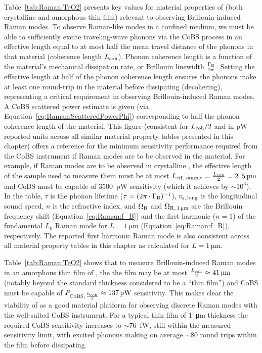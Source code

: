 Table~\ref{tab:Raman:TeO2} presents key values for material properties of  (both crystalline and amorphous thin film) relevant to observing Brillouin-induced Raman modes. To observe Raman-like modes in a confined medium, we must be able to sufficiently excite traveling-wave phonons via the \ac{CoBS} process in an effective length equal to at most half the mean travel distance of the phonons in that material (coherence length \(L_{\rm coh}\)). Phonon coherence length is a function of the material's mechanical dissipation rate, or Brillouin linewidth \(\frac{\Gamma_{\rm B}}{2\pi}\). Setting the effective length at half of the phonon coherence length ensures the phonons make at least one round-trip in the material before dissipating (decohering), representing a critical requirement in observing Brillouin-induced Raman modes. A \ac{CoBS} scattered power estimate is given (via Equation~\ref{eq:Raman:ScatteredPowerPhi}) corresponding to half the phonon coherence length of the material. This figure (consistent for \(L_{\rm coh}/2\) and in \si{\pico\watt} reported units across all similar material property tables presented in this chapter) offers a reference for the minimum sensitivity performance required from the \ac{CoBS} instrument if Raman modes are to be observed in the material. For example, if Raman modes are to be observed in crystalline , the effective length of the sample used to measure them must be at most \(L_{\rm eff,\,sample} = \frac{L_{\rm coh}}{2} = \SI{215}{\micro\meter}\) and \ac{CoBS} must be capable of \SI{3500}{\pico\watt} sensitivity (which it achieves by \(\sim\)\(10^{3}\)). In the table, \(\tau\) is the phonon lifetime (\(\tau = (2\pi\cdot\Gamma_{\rm B})^{-1}\)), \(v_{\rm s,\,long}\) is the longitudinal sound speed, \(n\) is the refractive index, and \(\Omega_{\rm B}\) and \(\Omega_{\rm R,\,\SI{1}{\micro\meter}}\) are the Brillouin frequency shift (Equation~\ref{eq:Raman:f_B}) and the first harmonic (\(n = 1\)) of the fundamental \(L_{0}\) Raman mode for \(L = \SI{1}{\micro\meter}\) (Equation~\ref{eq:Raman:f_R}), respectively. The reported first harmonic Raman mode is also consistent across all material property tables in this chapter as calculated for \(L = \SI{1}{\micro\meter}\).

Table~\ref{tab:Raman:TeO2} shows that to measure Brillouin-induced Raman modes in an amorphous thin film of , the the film may be at most \(\frac{L_{\rm coh}}{2} \approx \SI{41}{\micro\meter}\) (notably beyond the standard thickness considered to be a ``thin film'') and \ac{CoBS} must be capable of \(P_{\rm CoBS,\,\frac{L_{\rm coh}}{2}} \approx \SI{137}{\pico\watt}\) sensitivity. This makes clear the viability of  as a good material platform for observing discrete Raman modes with the well-suited \ac{CoBS} instrument. For a typical thin film of \SI{1}{\micro\meter} thickness the required \ac{CoBS} sensitivity increases to \(\sim\)\SI{76}{\femto\watt}, still within the measured sensitivity limit, with excited phonons making on average \(\sim\)80 round trips within the film before dissipating.

